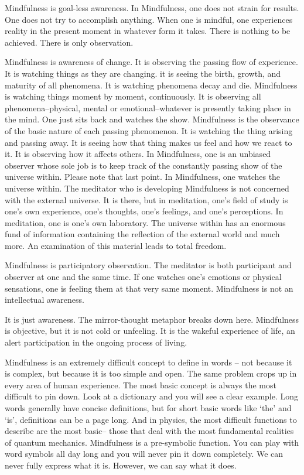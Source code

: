 Mindfulness is goal-less awareness. In Mindfulness, one does not strain for
results. One does not try to accomplish anything.  When one is mindful, one
experiences reality in the present moment in whatever form it takes. There is
nothing to be achieved.  There is only observation.

Mindfulness is awareness of change. It is observing the passing flow of
experience. It is watching things as they are changing. it is seeing the birth,
growth, and maturity of all phenomena. It is watching phenomena decay and die.
Mindfulness is watching things moment by moment, continuously. It is observing
all phenomena--physical, mental or emotional--whatever is presently taking place
in the mind. One just sits back and watches the show. Mindfulness is the
observance of the basic nature of each passing phenomenon. It is watching the
thing arising and passing away. It is seeing how that thing makes us feel and
how we react to it.  It is observing how it affects others. In Mindfulness, one
is an unbiased observer whose sole job is to keep track of the constantly
passing show of the universe within. Please note that last point. In
Mindfulness, one watches the universe within. The meditator who is developing
Mindfulness is not concerned with the external universe. It is there, but in
meditation, one's field of study is one's own experience, one's thoughts, one's
feelings, and one's perceptions.  In meditation, one is one's own laboratory.
The universe within has an enormous fund of information containing the
reflection of the external world and much more. An examination of this material
leads to total freedom.

Mindfulness is participatory observation. The meditator is both participant and
observer at one and the same time. If one watches one's emotions or physical
sensations, one is feeling them at that very same moment. Mindfulness is not an
intellectual awareness.

It is just awareness. The mirror-thought metaphor breaks down here. Mindfulness
is objective, but it is not cold or unfeeling. It is the wakeful experience of
life, an alert participation in the ongoing process of living.

Mindfulness is an extremely difficult concept to define in words -- not because
it is complex, but because it is too simple and open. The same problem crops up
in every area of human experience. The most basic concept is always the most
difficult to pin down. Look at a dictionary and you will see a clear example.
Long words generally have concise definitions, but for short basic words like
`the' and `is', definitions can be a page long. And in physics, the most
difficult functions to describe are the most basic-- those that deal with the
most fundamental realities of quantum mechanics. Mindfulness is a pre-symbolic
function. You can play with word symbols all day long and you will never pin it
down completely. We can never fully express what it is. However, we can say what
it does.

